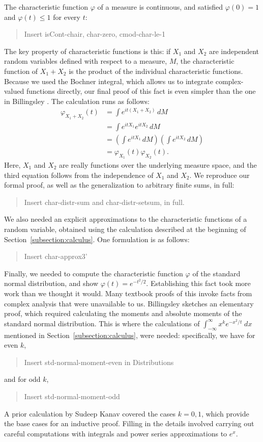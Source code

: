 \documentclass{svjour3}
\newcommand{\todo}[1]{{\color{red}#1}}
\newcommand{\ph}{\varphi}
\begin{document}
The characteristic function $\ph$ of a measure is continuous, and satisfied $\ph(0) = 1$ and $\ph(t) \leq 1$ for every $t$:
\begin{quote}
 \todo{Insert isCont-chair, char-zero, cmod-char-le-1}
\end{quote}
The key property of characteristic functions is this: if $X_1$ and $X_2$ are independent random variables defined with respect to a measure, $M$, the characteristic function of $X_1 + X_2$ is the product of the individual characteristic functions. Because we used the Bochner integral, which allows us to integrate complex-valued functions directly, our final proof of this fact is even simpler than the one in Billingsley \cite{billingsley:95}. The calculation runs as follows:
\begin{align*}
\ph_{X_1 + X_2}(t) &= \int e^{i t (X_1 + X_2)} \, dM  \\
                   &= \int e^{i t X_1} e^{i t X_2} \, dM \\
                   &= \left(\int e^{i t X_1} \, dM\right) \left(\int e^{i t X_2} \, dM\right) \\
                   &= \ph_{X_1}(t) \ph_{X_2}(t).
\end{align*}
Here, $X_1$ and $X_2$ are really functions over the underlying measure space, and the third equation follows from the independence of $X_1$ and $X_2$. We reproduce our formal proof, as well as the generalization to arbitrary finite sums, in full:
\begin{quote}
\todo{Insert char-distr-sum and char-distr-setsum, in full.}
\end{quote}
We also needed an explicit approximations to the characteristic functions of a random variable, obtained using the calculation described at the beginning of Section~\ref{subsection:calculus}. One formulation is as follows:
\begin{quote}
 \todo{Insert char-approx3'}
\end{quote}

Finally, we needed to compute the characteristic function $\ph$ of the standard normal distribution, and show $\ph(t) = e^{-t^2/2}$. Establishing this fact took more work than we thought it would. Many textbook proofs of this invoke facts from complex analysis that were unavailable to us. Billingsley \cite[page 344]{billingsley:95} sketches an elementary proof, which required calculating the moments and absolute moments of the standard normal distribution. This is where the calculations of $\int_{-\infty}^\infty x^k e^{-x^2 / t} \; dx$ mentioned in Section~\ref{subsection:calculus}, were needed: specifically, we have for even $k$, 
\begin{quote}
\todo{Insert std-normal-moment-even in Distributions}
\end{quote}
and for odd $k$,
\begin{quote}
\todo{Insert std-normal-moment-odd}
\end{quote}
A prior calculation by Sudeep Kanav covered the cases $k = 0, 1$, which provide the base cases for an inductive proof. Filling in the details involved carrying out careful computations with integrals and power series approximations to $e^x$.
\end{document}
